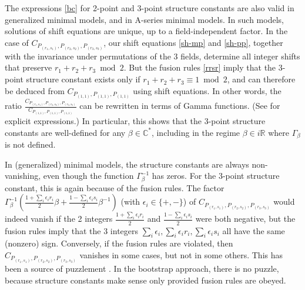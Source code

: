 \documentclass[12pt, a4paper]{article}
\begin{document}
The expressions \eqref{bc} for 2-point and 3-point structure constants are also valid in generalized minimal models, and in A-series minimal models. In such models, solutions of shift equations are unique, up to a field-independent factor. In the case of $C_{P_{(r_1,s_1)},P_{(r_2,s_2)},P_{(r_3,s_3)}}$, our shift equations \eqref{sh-mp} and \eqref{sh-pp}, together with the invariance under permutations of the 3 fields, determine all integer shifts that preserve $r_1+r_2+r_3\bmod 2$. But the fusion rules \eqref{rrsr} imply that the 3-point structure constant exists only if $r_1+r_2+r_3\equiv 1\bmod 2$, and can therefore be deduced from $C_{P_{(1,1)},P_{(1,1)},P_{(1,1)}}$ using shift equations. In other words, the ratio $\frac{C_{P_{(r_1,s_1)},P_{(r_2,s_2)},P_{(r_3,s_3)}}}{C_{P_{(1,1)},P_{(1,1)},P_{(1,1)}}}$ can be rewritten in terms of Gamma functions. (See \cite[Section 3.2.1]{rib14} for explicit expressions.) In particular, this shows that the 3-point structure constants are well-defined for any $\beta\in \mathbb{C}^*$, including in the regime $\beta\in i\mathbb{R}$ where $\Gamma_\beta$ is not defined.

In (generalized) minimal models, the structure constants are always non-vanishing, even though the function $\Gamma_\beta^{-1}$ has zeros. For the 3-point structure constant, this is again because of the fusion rules. 
The factor $\Gamma_\beta^{-1}\left(\frac{1+\sum_i\epsilon_ir_i}{2}\beta + \frac{1-\sum_i \epsilon_is_i}{2}\beta^{-1}\right)$ (with $\epsilon_i\in \{+,-\}$) of $C_{P_{(r_1,s_1)},P_{(r_2,s_2)},P_{(r_3,s_3)}}$ would indeed vanish if the 2 integers $\frac{1+\sum_i\epsilon_ir_i}{2}$ and $\frac{1-\sum_i \epsilon_is_i}{2}$ were both negative, but the fusion rules imply that the 3 integers $\sum_i\epsilon_i,\sum_i\epsilon_ir_i,\sum_i\epsilon_is_i$ all have the same (nonzero) sign. Conversely, if the fusion rules are violated, then $C_{P_{(r_1,s_1)},P_{(r_2,s_2)},P_{(r_3,s_3)}}$ vanishes in some cases, but not in some others. This has been a source of puzzlement \cite{zam05}. In the bootstrap approach, there is no puzzle, because structure constants make sense only provided fusion rules are obeyed. 
\end{document}
